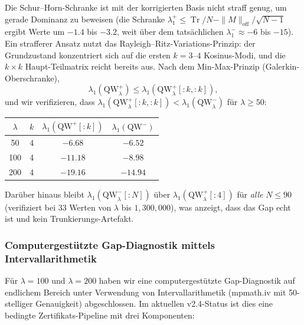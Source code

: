 ﻿\documentclass[12pt,a4paper]{article}
\theoremstyle{definition}
\theoremstyle{remark}
\begin{document}
Die Schur--Horn-Schranke ist mit der korrigierten Basis nicht straff genug, um gerade Dominanz zu beweisen (die Schranke $\lambda_1^+ \leq \operatorname{Tr}/N - \|M\|_{\mathrm{off}}/\sqrt{N-1}$ ergibt Werte um $-1.4$ bis $-3.2$, weit über dem tatsächlichen $\lambda_1^- \approx -6$ bis $-15$). Ein strafferer Ansatz nutzt das Rayleigh--Ritz-Variations-Prinzip: der Grundzustand konzentriert sich auf die ersten $k = 3$--$4$ Kosinus-Modi, und die $k \times k$ Haupt-Teilmatrix reicht bereits aus. Nach dem Min-Max-Prinzip (Galerkin-Oberschranke),
\[ \lambda_1(\mathrm{QW}_\lambda^+) \leq \lambda_1(\mathrm{QW}_\lambda^+[{:}k,{:}k]), \]
und wir verifizieren, dass $\lambda_1(\mathrm{QW}_\lambda^+[{:}k,{:}k]) < \lambda_1(\mathrm{QW}_\lambda^-)$ für $\lambda \geq 50$:

\begin{center}
\begin{tabular}{cccc}
$\lambda$ & $k$ & $\lambda_1(\mathrm{QW}^+[{:}k])$ & $\lambda_1(\mathrm{QW}^-)$ \\
\hline
50  & 4 & $-6.68$ & $-6.52$ \\
100 & 4 & $-11.18$ & $-8.98$ \\
200 & 4 & $-19.16$ & $-14.94$
\end{tabular}
\end{center}

Darüber hinaus bleibt $\lambda_1(\mathrm{QW}_\lambda^-[{:}N])$ über $\lambda_1(\mathrm{QW}_\lambda^+[{:}4])$ für \emph{alle} $N \leq 90$ (verifiziert bei $33$ Werten von $\lambda$ bis $1{,}300{,}000$), was anzeigt, dass das Gap echt ist und kein Trunkierungs-Artefakt.

\label{sec:computer-proof}
\subsubsection{Computergestützte Gap-Diagnostik mittels Intervallarithmetik}

Für $\lambda = 100$ und $\lambda = 200$ haben wir eine computergestützte Gap-Diagnostik auf endlichem Bereich unter Verwendung von Intervallarithmetik (mpmath.iv mit 50-stelliger Genauigkeit) abgeschlossen. Im aktuellen v2.4-Status ist dies eine bedingte Zertifikats-Pipeline mit drei Komponenten:
\end{document}
